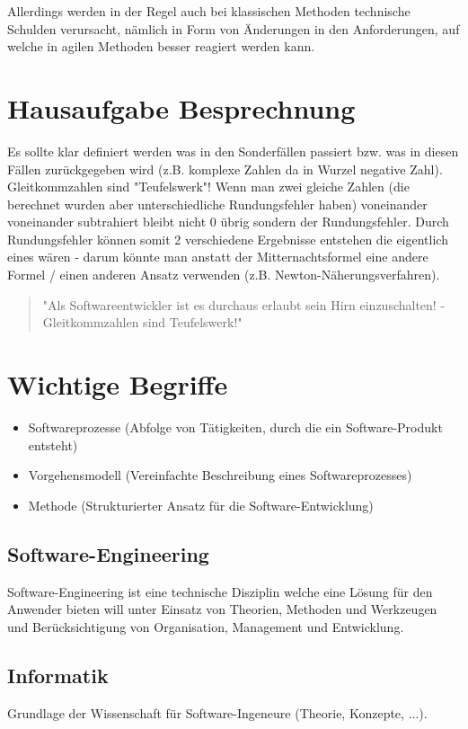 Allerdings werden in der Regel auch bei klassischen Methoden technische Schulden verursacht, nämlich in Form von Änderungen in den Anforderungen, auf welche in agilen Methoden besser reagiert werden kann.

\chapter{Hausaufgabe Besprechnung}
Es sollte klar definiert werden was in den Sonderfällen passiert bzw. was in diesen Fällen zurückgegeben wird (z.B. komplexe Zahlen da in Wurzel negative Zahl). Gleitkommzahlen sind "Teufelswerk"! Wenn man zwei gleiche Zahlen (die berechnet wurden aber unterschiedliche Rundungsfehler haben) voneinander voneinander subtrahiert bleibt nicht 0 übrig sondern der Rundungsfehler. Durch Rundungsfehler können somit 2 verschiedene Ergebnisse entstehen die eigentlich eines wären - darum könnte man anstatt der Mitternachtsformel eine andere Formel / einen anderen Ansatz verwenden (z.B. Newton-Näherungsverfahren). 

\begin{quote}"Als Softwareentwickler ist es durchaus erlaubt sein Hirn einzuschalten! - Gleitkommzahlen sind Teufelswerk!"\end{quote} 

\chapter{Wichtige Begriffe}

\begin{itemize}
    \item Softwareprozesse (Abfolge von Tätigkeiten, durch die ein Software-Produkt entsteht)
    \item Vorgehensmodell (Vereinfachte Beschreibung eines Softwareprozesses)
    \item Methode (Strukturierter Ansatz für die Software-Entwicklung)
\end{itemize}

\section{Software-Engineering}
Software-Engineering ist eine technische Disziplin  welche eine Lösung für den Anwender bieten will unter Einsatz von Theorien, Methoden und Werkzeugen und Berücksichtigung von Organisation, Management und Entwicklung. 

\section{Informatik}
Grundlage der Wissenschaft für Software-Ingeneure (Theorie, Konzepte, ...).

